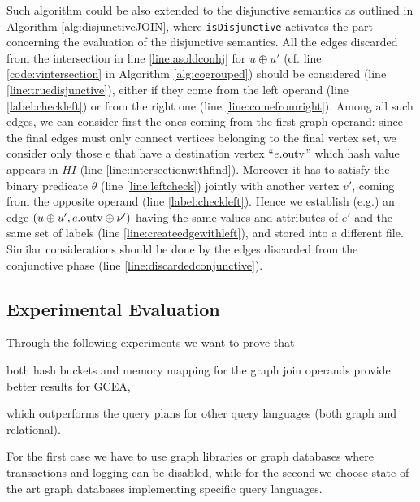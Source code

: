 {Such algorithm {{could}} be also extended to the disjunctive semantics as outlined in Algorithm \vref{alg:disjunctiveJOIN}, where \texttt{isDisjunctive} activates the part concerning the evaluation of the disjunctive semantics. All the edges discarded from the intersection in line \ref{line:asoldconhj} for $u\oplus u'$  (cf. line \ref{code:vintersection} in Algorithm \ref{alg:cogrouped})
	should be considered (line \ref{line:truedisjunctive}), either if they come from the left operand (line \ref{label:checkleft}) or from the right
	one (line \ref{line:comefromright}). Among all such edges, we can consider first the ones coming from the first graph operand: since the final edges must only connect vertices belonging to the final vertex set, we consider only those $e$ that have a destination vertex ``$e.\textup{outv}$'' which hash value appears in $HI$ (line \ref{line:intersectionwithfind}). Moreover it has to satisfy the binary predicate $\theta$ (line \ref{line:leftcheck}) jointly with another vertex $v'$, coming from
	the opposite operand (line \ref{label:checkleft}). Hence we establish (e.g.) an edge $(u\oplus u',e.\textup{outv}\oplus \nu')$ having the same values
	and attributes of $e'$ and the same set of labels (line \ref{line:createedgewithleft}), and stored into a different file. Similar considerations should be done by the edges discarded from the conjunctive phase (line \ref{line:discardedconjunctive}).}


\subsection{Experimental Evaluation}\label{sub:results}
Through the following experiments we want to prove that
\begin{enumerate*}[label=\textit{(\roman*)}]
	\item both hash buckets and memory mapping for the graph join operands provide better results for
	GCEA, \item which outperforms the query plans for other query languages (both graph and
	relational).
\end{enumerate*} For the first case we have to use graph libraries or graph databases
where transactions and logging can be disabled, while for the second we choose state of the art
graph databases implementing specific query languages.

